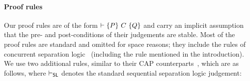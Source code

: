 \paragraph{Proof rules}
Our proof rules are of the form $\entails \{P\}\ C\ \{Q\}$ and carry
an implicit assumption that the pre- and post-conditions of their
judgements are stable. Most of the proof rules are standard and
omitted for space reasons; they include the rules of concurrent
separation logic~\cite{csl-tcs} (including the 
rule mentioned in the introduction). We use two additional rules,
similar to their CAP counterparts~\cite{cap-ecoop10}, which are as
follows, where $\entails_{\textsf{SL}}$ denotes the standard
sequential separation logic judgement:
\begin{mathpar}

\end{mathpar}
%
%
